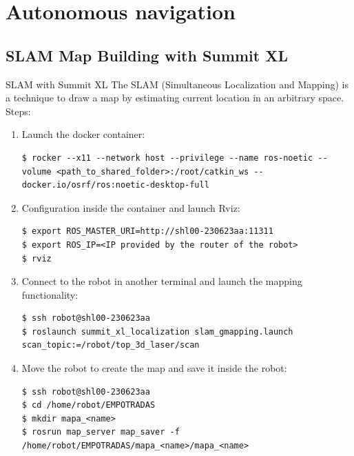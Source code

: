 \section{Autonomous navigation}
\subsection{SLAM Map Building with Summit XL}

\begin{frame}[fragile]{SLAM with Summit XL}
The SLAM (Simultaneous Localization and Mapping) is a technique to draw a map by estimating current location in an arbitrary space. Steps: %

\begin{enumerate}
    \item Launch the docker container:
\begin{lstlisting}[language=shell]
$ rocker --x11 --network host --privilege --name ros-noetic --volume <path_to_shared_folder>:/root/catkin_ws -- docker.io/osrf/ros:noetic-desktop-full
\end{lstlisting}
    \item Configuration inside the container and launch Rviz:
\begin{lstlisting}[language=shell]
$ export ROS_MASTER_URI=http://shl00-230623aa:11311
$ export ROS_IP=<IP provided by the router of the robot>
$ rviz
\end{lstlisting}
    \item Connect to the robot in another terminal and launch the mapping functionality:
\begin{lstlisting}[language=shell]
$ ssh robot@shl00-230623aa
$ roslaunch summit_xl_localization slam_gmapping.launch scan_topic:=/robot/top_3d_laser/scan
\end{lstlisting}
    \item Move the robot to create the map and save it inside the robot:
\begin{lstlisting}[language=shell]
$ ssh robot@shl00-230623aa
$ cd /home/robot/EMPOTRADAS
$ mkdir mapa_<name>
$ rosrun map_server map_saver -f /home/robot/EMPOTRADAS/mapa_<name>/mapa_<name>
\end{lstlisting}
\end{enumerate}
\end{frame}



